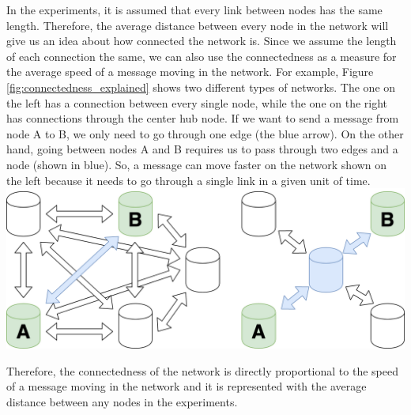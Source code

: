 \documentclass[journal]{IEEEtran}
\begin{document}
\noindent In the experiments, it is assumed that every link between nodes has the same length. Therefore, the average distance between every node in the network will give us an idea about how connected the network is. Since we assume the length of each connection the same, we can also use the connectedness as a measure for the average speed of a message moving in the network. For example, Figure \ref{fig:connectedness_explained} shows two different types of networks. The one on the left has a connection between every single node, while the one on the right has connections through the center hub node. If we want to send a message from node A to B, we only need to go through one edge (the blue arrow). On the other hand, going between nodes A and B requires us to pass through two edges and a node (shown in blue). So, a message can move faster on the network shown on the left because it needs to go through a single link in a given unit of time.\\

\begingroup
    \centering
    \bigskip
    \includegraphics[width=\columnwidth]{images/speed.png}
    \label{fig:connectedness_explained}
    \bigskip
\endgroup

\noindent Therefore, the connectedness of the network is directly proportional to the speed of a message moving in the network and it is represented with the average distance between any nodes in the experiments.

\end{document}
